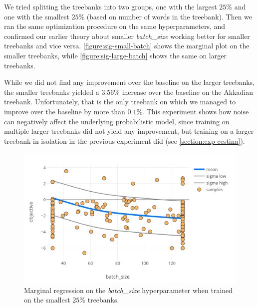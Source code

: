 We tried splitting the treebanks into two groups, one with the largest $25\%$ and one with the smallest $25\%$ (based on number of words in the treebank). Then we ran the same optimization procedure on the same hyperparameters, and confirmed our earlier theory about smaller \emph{batch\_size} working better for smaller treebanks and vice versa. \autoref{figure:sig-small-batch} shows the marginal plot on the smaller treebanks, while \autoref{figure:sig-large-batch} shows the same on larger treebanks.

While we did not find any improvement over the baseline on the larger treebanks, the smaller treebanks yielded a $3.56\%$ increase over the baseline on the Akkadian treebank. Unfortunately, that is the only treebank on which we managed to improve over the baseline by more than $0.1\%$. This experiment shows how noise can negatively affect the underlying probabilistic model, since training on multiple larger treebanks did not yield any improvement, but training on a larger treebank in isolation in the previous experiment did (see \autoref{section:exp-cestina}).

\begin{figure}
	\begin{center}
		\includegraphics[width=1.0\textwidth]{images/sig-small-batch.png}
		\caption{Marginal regression on the \emph{batch\_size} hyperparameter when trained on the smallest $25\%$ treebanks.}
		\label{figure:sig-small-batch}
	\end{center}
\end{figure}

